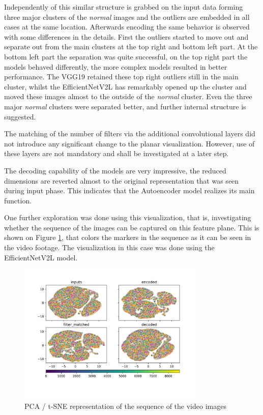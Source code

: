 Independently of this similar structure is grabbed on the input data forming three major clusters
of the \emph{normal} images and the outliers are embedded in all cases at the same location.
Afterwards encoding the same behavior is observed with some differences in the details.
First the outliers started to move out and separate out from the main clusters at the top right
and bottom left part.
At the bottom left part the separation was quite successful, on the top right part the models behaved
differently, the more complex models resulted in better performance.
The VGG19 retained these top right outliers still in the main cluster, whilst the EfficientNetV2L
has remarkably opened up the cluster and moved these images almost to the outside of the \emph{normal}
cluster.
Even the three major \emph{normal} clusters were separated better, and further internal structure is
suggested.

The matching of the number of filters via the additional convolutional layers did not introduce any
significant change to the planar visualization.
However, use of these layers are not mandatory and shall be investigated at a later step.

The decoding capability of the models are very impressive, the reduced dimensions are reverted
almost to the original representation that was seen during input phase.
This indicates that the Autoencoder model realizes its main function.

One further exploration was done using this visualization, that is, investigating whether the sequence
of the images can be captured on this feature plane.
This is shown on Figure \ref{fig:efficientnetv2l_pca2},
that colors the markers in the sequence as it can be seen in the video footage.
The visualization in this case was done using the EfficientNetV2L model.

\begin{figure}[H]
    \centering
    \includegraphics[width=0.8\textwidth,trim={0 1cm 0 1cm},clip]{./results/efficientnetv2l_vgg19/20230525_194238_feature_vectors_2.png}
    \caption{PCA / t-SNE representation of the sequence of the video images}
    \label{fig:efficientnetv2l_pca2}
\end{figure}

